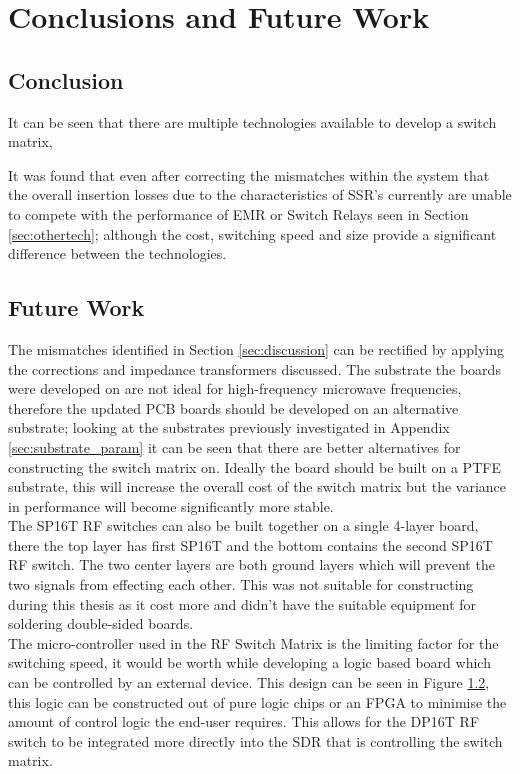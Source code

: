 \documentclass[12pt,openany,a4paper]{book}
\begin{document}
\chapter{Conclusions and Future Work}

\section{Conclusion}
It can be seen that there are multiple technologies available to develop a switch matrix, 

It was found that even after correcting the mismatches within the system that the overall insertion losses due to the characteristics of SSR's currently are unable to compete with the performance of EMR or Switch Relays seen in Section \ref{sec:othertech}; although the cost, switching speed and size provide a significant difference between the technologies. \\



\section{Future Work}
The mismatches identified in Section \ref{sec:discussion} can be rectified by applying the corrections and impedance transformers discussed. The substrate the boards were developed on are not ideal for high-frequency microwave frequencies, therefore the updated PCB boards should be developed on an alternative substrate; looking at the substrates previously investigated in Appendix \ref{sec:substrate_param} it can be seen that there are better alternatives for constructing the switch matrix on. Ideally the board should be built on a PTFE substrate, this will increase the overall cost of the switch matrix but the variance in performance will become significantly more stable.\\
The SP16T RF switches can also be built together on a single 4-layer board, there the top layer has first SP16T and the bottom contains the second SP16T RF switch. The two center layers are both ground layers which will prevent the two signals from effecting each other. This was not suitable for constructing during this thesis as it cost more and didn't have the suitable equipment for soldering double-sided boards.\\
The micro-controller used in the RF Switch Matrix is the limiting factor for the switching speed, it would be worth while developing a logic based board which can be controlled by an external device. This design can be seen in Figure \ref{}, this logic can be constructed out of pure logic chips or an FPGA to minimise the amount of control logic the end-user requires. This allows for the DP16T RF switch to be integrated more directly into the SDR that is controlling the switch matrix.
\end{document}
